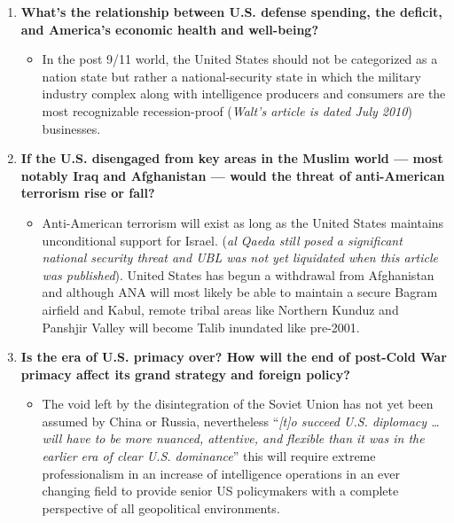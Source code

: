 \documentclass[12pt]{article}
\begin{document}
\begin{justify}
\begin{enumerate}
    \item \textbf{What’s the relationship between U.S. defense spending, the deficit, and America’s economic health and well-being?}
      \begin{itemize}
        \item In the post 9/11 world, the United States should not be categorized as a nation state but rather a national-security state in which the military industry complex along with intelligence producers and consumers are the most recognizable recession-proof (\emph{Walt's article is dated July 2010}) businesses.
      \end{itemize}
    \item \textbf{If the U.S. disengaged from key areas in the Muslim world — most notably Iraq and Afghanistan — would the threat of anti-American terrorism rise or fall?}
  \begin{itemize}
    \item Anti-American terrorism will exist as long as the United States maintains unconditional support for Israel. (\emph{al Qaeda still posed a significant national security threat and UBL was not yet liquidated when this article was published}). United States has begun a withdrawal from Afghanistan and although ANA will most likely be able to maintain a secure Bagram airfield and Kabul, remote tribal areas like Northern Kunduz and  Panshjir Valley will become Talib inundated like pre-2001.  
      \end{itemize}
    \item \textbf{Is the era of U.S. primacy over? How will the end of post-Cold War primacy affect its grand strategy and foreign policy?}
  \begin{itemize}
    \item The void left by the disintegration of the Soviet Union has not yet been assumed by China or Russia, nevertheless “\emph{[t]o succeed U.S. diplomacy \dots will have to be more nuanced, attentive, and flexible than it was in the earlier era of clear U.S. dominance}” this will require extreme professionalism in an increase of intelligence operations in an ever changing field to provide senior US policymakers with a complete perspective of all geopolitical environments.
      \end{itemize}
  \end{enumerate}
  \doublespacing
  \vspace{20pt}
  \hline

\end{justify}
\end{document}
